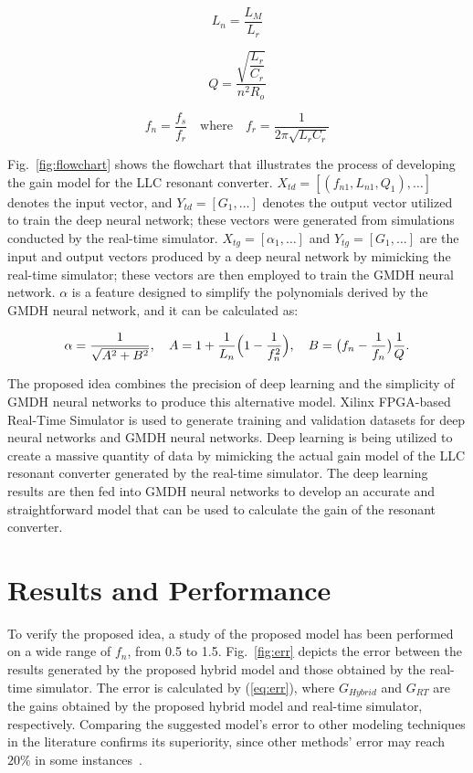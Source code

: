 \documentclass{article} %
\begin{document}
\begin{equation}
L_{n}=\dfrac{L_{M}}{L_{r}}
\label{eq:Params}
\end{equation}

\begin{equation}
Q = \dfrac{ \sqrt{\dfrac{L_{r}}{C_{r}}} }{n^2 R_{o}}
\label{eq:Params2}
\end{equation}

\begin{equation}
f_{n} = \dfrac{f_{s}}{f_{r}} \quad \text{where} \quad f_{r} = \frac{1}{2\pi \sqrt{L_{r}C_{r}}}
\label{eq:Params3}
\end{equation}

Fig.~\ref{fig:flowchart} shows the flowchart that illustrates the process of developing the gain model for the LLC resonant converter.
$X_{td}=[(f_{n1}, L_{n1}, Q_{1}), \dots ]$ denotes the input vector, and $Y_{td}=[G_{1}, \dots]$ denotes the output vector utilized to train the deep neural network; these vectors were generated from simulations conducted by the real-time simulator. 
$X_{tg}=[\alpha_{1}, \dots]$ and $Y_{tg}=[G_{1}, \dots]$ are the input and output vectors produced by a deep neural network by mimicking the real-time simulator; these vectors are then employed to train the GMDH neural network. $\alpha$ is a feature designed to simplify the polynomials derived by the GMDH neural network, and it can be calculated as:

\begin{equation}
\alpha = \dfrac {1}{\sqrt{A^2 + B^2}},\quad
A = 1 + \dfrac{1}{L_{n}}\Bigl(1-\dfrac{1}{f_{n}^2}\Bigr),\quad
B = \bigl(f_{n}-\dfrac{1}{f_{n}}\bigr)\dfrac{1}{Q}.
\label{eq:Params4}
\end{equation}

The proposed idea combines the precision of deep learning and the simplicity of GMDH neural networks to produce this alternative model. 
Xilinx FPGA-based Real-Time Simulator is used to generate training and validation datasets for deep neural networks and GMDH neural networks. 
Deep learning is being utilized to create a massive quantity of data by mimicking the actual gain model of the LLC resonant converter generated by the real-time simulator. 
The deep learning results are then fed into GMDH neural networks to develop an accurate and straightforward model that can be used to calculate the gain of the resonant converter.

\section{Results and Performance}
To verify the proposed idea, a study of the proposed model has been performed on a wide range of $f_{n}$, from 0.5 to 1.5. Fig.~\ref{fig:err} depicts the error between the results generated by the proposed hybrid model and those obtained by the real-time simulator. The error is calculated by (\ref{eq:err}), where $G_{Hybrid}$ and $G_{RT}$ are the gains obtained by the proposed hybrid model and real-time simulator, respectively. Comparing the suggested model's error to other modeling techniques in the literature confirms its superiority, since other methods' error may reach $20\%$ in some instances~\cite{Wei2019,Wei2019b}.
\end{document}
